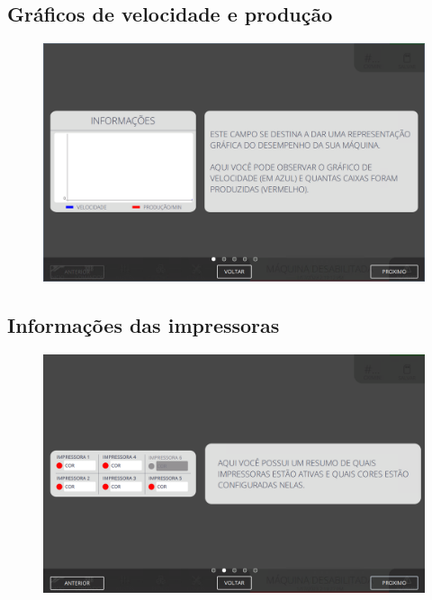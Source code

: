 \subsection{\small{Gráficos de velocidade e produção}}
\vspace*{\fill}
\begin{figure}[h]
    \centering
    \includegraphics[width=576 px,height=360 px]{src/imagesICV/01-main/2.png}
\end{figure}
\vspace*{\fill}

\newpage
\thispagestyle{fancy}
\vspace*{40 pt}
\subsection{\small{Informações das impressoras}}
\vspace*{\fill}
\begin{figure}[h]
    \centering
    \includegraphics[width=576 px,height=360 px]{src/imagesICV/01-main/3.png}
\end{figure}
\vspace*{\fill}

